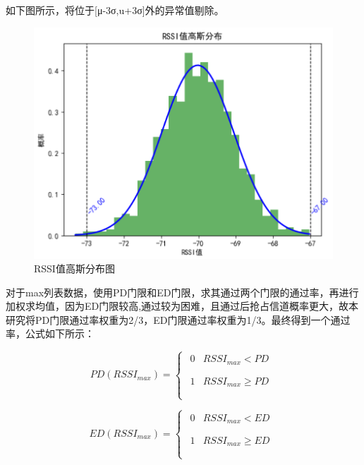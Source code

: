 \documentclass[bwprint]{gmcmthesis}
\begin{document}
如下图所示，将位于[μ-3σ,u+3σ]外的异常值剔除。

\begin{figure}[H]
	\centering
	\includegraphics[width=0.7\linewidth]{figures/4.3}
	\caption{RSSI值高斯分布图}
	\label{fig:RSSI值高斯分布图}
\end{figure}

对于max列表数据，使用PD门限和ED门限，求其通过两个门限的通过率，再进行加权求均值，因为ED门限较高,通过较为困难，且通过后抢占信道概率更大，故本研究将PD门限通过率权重为2/3，ED门限通过率权重为1/3。最终得到一个通过率，公式如下所示：

\begin{equation}
	PD\left( RSSI_{max} \right) =\left\{ \begin{array}{l}
		\begin{matrix}
			0&		RSSI_{max}<PD\\
		\end{matrix}\\
		\begin{matrix}
			1&		RSSI_{max}\ge PD\\
		\end{matrix}\\
	\end{array} \right. 
\end{equation}

\begin{equation}
	ED\left( RSSI_{max} \right) =\left\{ \begin{array}{l}
		\begin{matrix}
			0&		RSSI_{max}<ED\\
		\end{matrix}\\
		\begin{matrix}
			1&		RSSI_{max}\ge ED\\
		\end{matrix}\\
	\end{array} \right. 
\end{equation}
\end{document}

